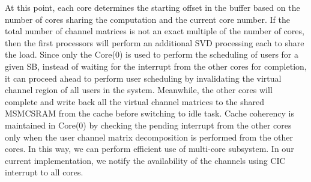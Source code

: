 \documentclass[conference,letterpaper]{./../../IEEE/IEEEtran}
\begin{document}
At this point, each core determines the starting offset in the buffer based on the number of cores sharing the computation and the current core number. If the total number of channel matrices is not an exact multiple of the number of cores, then the first  processors will perform an additional SVD processing each to share the load. Since only the Core(0) is used to perform the scheduling of users for a given SB, instead of waiting for the interrupt from the other cores for completion, it can proceed ahead to perform user scheduling by invalidating the virtual channel region of all users in the system. Meanwhile, the other cores will complete and write back all the virtual channel matrices to the shared \ac{MSMCSRAM} from the cache before switching to idle task. Cache coherency is maintained in Core(0) by checking the pending interrupt from the other cores only when the user channel matrix decomposition is performed from the other cores. In this way, we can perform efficient use of multi-core subsystem. In our current implementation, we notify the availability of the channels using \ac{CIC} interrupt to all cores. 
\end{document}
